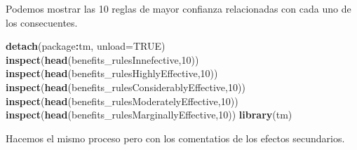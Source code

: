 \documentclass[spanish,]{article}
\newenvironment{Shaded}{\begin{snugshade}}{\end{snugshade}}
\newcommand{\KeywordTok}[1]{\textcolor[rgb]{0.13,0.29,0.53}{\textbf{#1}}}
\newcommand{\DataTypeTok}[1]{\textcolor[rgb]{0.13,0.29,0.53}{#1}}
\newcommand{\DecValTok}[1]{\textcolor[rgb]{0.00,0.00,0.81}{#1}}
\newcommand{\OtherTok}[1]{\textcolor[rgb]{0.56,0.35,0.01}{#1}}
\newcommand{\OperatorTok}[1]{\textcolor[rgb]{0.81,0.36,0.00}{\textbf{#1}}}
\newcommand{\NormalTok}[1]{#1}
\begin{document}
Podemos mostrar las 10 reglas de mayor confianza relacionadas con cada
uno de los consecuentes.

\begin{Shaded}
\begin{Highlighting}[]
\KeywordTok{detach}\NormalTok{(package}\OperatorTok{:}\NormalTok{tm, }\DataTypeTok{unload=}\OtherTok{TRUE}\NormalTok{)}
\KeywordTok{inspect}\NormalTok{(}\KeywordTok{head}\NormalTok{(benefits_rulesInnefective,}\DecValTok{10}\NormalTok{))}
\KeywordTok{inspect}\NormalTok{(}\KeywordTok{head}\NormalTok{(benefits_rulesHighlyEffective,}\DecValTok{10}\NormalTok{))}
\KeywordTok{inspect}\NormalTok{(}\KeywordTok{head}\NormalTok{(benefits_rulesConsiderablyEffective,}\DecValTok{10}\NormalTok{))}
\KeywordTok{inspect}\NormalTok{(}\KeywordTok{head}\NormalTok{(benefits_rulesModeratelyEffective,}\DecValTok{10}\NormalTok{))}
\KeywordTok{inspect}\NormalTok{(}\KeywordTok{head}\NormalTok{(benefits_rulesMarginallyEffective,}\DecValTok{10}\NormalTok{))}
\KeywordTok{library}\NormalTok{(tm)}
\end{Highlighting}
\end{Shaded}

Hacemos el mismo proceso pero con los comentatios de los efectos
secundarios.
\end{document}
